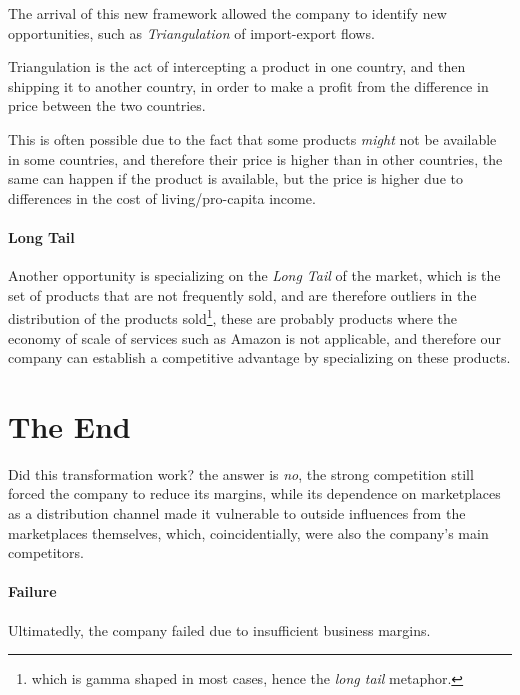 \documentclass[openright, twoside, twocolumn]{report}
\begin{document}
The arrival of this new framework allowed the company to identify new opportunities, such as \emph{Triangulation} of
import-export flows.

\begin{definition}[Triangulation]
  Triangulation is the act of intercepting a product in one country, and then shipping it to another country, in order to
  make a profit from the difference in price between the two countries.

  This is often possible due to the fact that some products \emph{might} not be available in some countries, and therefore
  their price is higher than in other countries, the same can happen if the product is available, but the price is higher due to
  differences in the cost of living/pro-capita income.
\end{definition}

\paragraph{Long Tail}
Another opportunity is specializing on the \emph{Long Tail} of the market, which is the set of products that are not
frequently sold, and are therefore outliers in the distribution of the products sold\footnote{
  which is gamma shaped in most cases, hence the \emph{long tail} metaphor.
}, these are probably products where the economy of scale of services such as Amazon is not applicable, and therefore
our company can establish a competitive advantage by specializing on these products.

\section{The End}

Did this transformation work? the answer is \emph{no}, the strong competition still forced the
company to reduce its margins, while its dependence on marketplaces as a distribution channel made it vulnerable to
outside influences from the marketplaces themselves, which, coincidentially, were also the company's main competitors.

\paragraph{Failure}
Ultimatedly, the company failed due to insufficient business margins.
\end{document}
